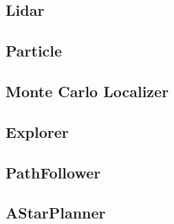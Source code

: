 \subsection{Lidar}
\subsection{Particle}
\subsection{Monte Carlo Localizer}
\subsection{Explorer}
\subsection{PathFollower}
\subsection{AStarPlanner}

